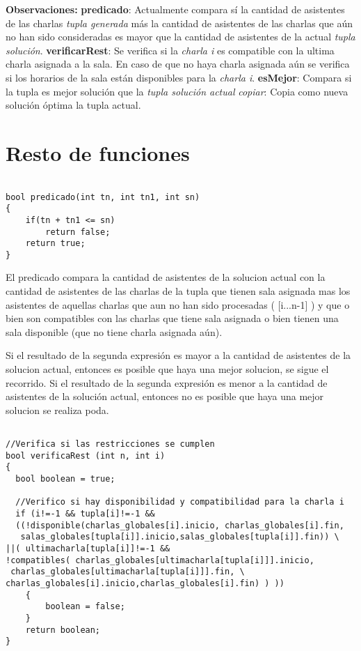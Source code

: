 \documentclass[11pt]{article}
\begin{document}
\textbf{Observaciones:} \newline
\textbf{predicado}: Actualmente compara sí la cantidad de asistentes de las charlas \textit{tupla generada} más la cantidad de asistentes de las charlas que aún no han sido consideradas es mayor que la cantidad de asistentes de la actual \textit{tupla solución}. \newline
\textbf{verificarRest}: Se verifica si la \textit{charla i} es compatible con la ultima charla asignada a la sala. En caso de que no haya charla asignada aún se verifica si los horarios de la sala están disponibles para la \textit{charla i}.\newline
\textbf{esMejor}: Compara si la tupla es mejor solución que la \textit{tupla solución actual} \newline
\textit{copiar}: Copia como nueva solución óptima la tupla actual.
\newpage
\section{Resto de funciones}

\begin{lstlisting}

bool predicado(int tn, int tn1, int sn)
{
	if(tn + tn1 <= sn)
		return false;
	return true;
}

\end{lstlisting}

El predicado compara la cantidad de asistentes de la solucion actual con la cantidad de asistentes de las charlas de la tupla que tienen sala asignada mas los asistentes de aquellas charlas que aun no han sido procesadas ( [i...n-1] ) y que o bien son compatibles con las charlas que tiene sala asignada o bien tienen una sala disponible (que no tiene charla asignada aún).

Si el resultado de la segunda expresión es mayor a la cantidad de asistentes de la solucion actual, entonces es posible que haya una mejor solucion, se sigue el recorrido.
Si el resultado de la segunda expresión es menor a la cantidad de asistentes de la solución actual, entonces no es posible que haya una mejor solucion se realiza poda.




\begin{lstlisting}

//Verifica si las restricciones se cumplen
bool verificaRest (int n, int i) 
{ 
  bool boolean = true;

  //Verifico si hay disponibilidad y compatibilidad para la charla i
  if (i!=-1 && tupla[i]!=-1 && 
  ((!disponible(charlas_globales[i].inicio, charlas_globales[i].fin,
   salas_globales[tupla[i]].inicio,salas_globales[tupla[i]].fin)) \
||( ultimacharla[tupla[i]]!=-1 && 
!compatibles( charlas_globales[ultimacharla[tupla[i]]].inicio,
 charlas_globales[ultimacharla[tupla[i]]].fin, \
charlas_globales[i].inicio,charlas_globales[i].fin) ) ))
	{
		boolean = false;
	}
	return boolean;
}

\end{lstlisting}
\end{document}
